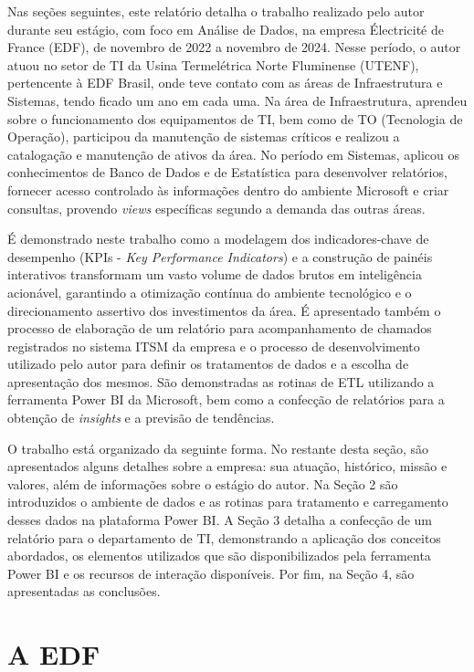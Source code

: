 Nas seções seguintes, este relatório  detalha o trabalho realizado pelo autor durante seu estágio, com foco em Análise de Dados, na empresa Électricité de France (EDF), de novembro de 2022 a novembro de 2024. 
Nesse período, o autor atuou no setor de TI da Usina Termelétrica Norte Fluminense (UTENF), pertencente à EDF Brasil, onde teve contato com as áreas de Infraestrutura e Sistemas, tendo ficado um ano em cada uma. Na área de Infraestrutura, aprendeu sobre o funcionamento dos equipamentos de TI, bem como de TO (Tecnologia de Operação), participou da manutenção de sistemas críticos e realizou a catalogação e manutenção de ativos da área. No período em Sistemas, aplicou os conhecimentos de Banco de Dados e de Estatística para desenvolver relatórios, fornecer acesso controlado às informações dentro do ambiente Microsoft e criar consultas, provendo \textit{views} específicas segundo a demanda das outras áreas.

É demonstrado neste trabalho como a modelagem dos indicadores-chave de desempenho (KPIs - \textit{Key Performance Indicators}) e a construção de painéis interativos transformam um vasto volume de dados brutos em inteligência acionável, garantindo a otimização contínua do ambiente tecnológico e o direcionamento assertivo dos investimentos da área. 
É apresentado também o processo de elaboração de um relatório para acompanhamento de chamados registrados no sistema ITSM da empresa e o processo de desenvolvimento utilizado pelo autor para definir os tratamentos de dados e a escolha de apresentação dos mesmos. São demonstradas as rotinas de ETL utilizando a ferramenta Power BI da Microsoft, bem como a confecção de relatórios para a obtenção de \textit{insights} e a previsão de tendências.

O trabalho está organizado da seguinte forma. 
No restante desta seção, são apresentados alguns detalhes sobre a empresa: sua atuação, histórico, missão e valores, além de informações sobre o estágio do autor. Na Seção 2 são introduzidos o ambiente de dados e as rotinas para tratamento e carregamento desses dados na plataforma Power BI. A Seção 3 detalha a confecção de um relatório para o departamento de TI, demonstrando a aplicação dos conceitos abordados, os elementos utilizados que são disponibilizados pela ferramenta Power BI e os recursos de interação disponíveis. Por fim, na Seção 4, são apresentadas as conclusões.


\section{A EDF}


